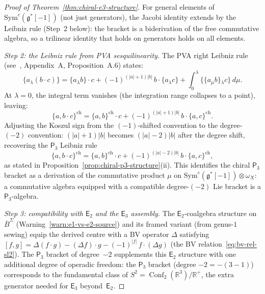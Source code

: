 \documentclass[11pt,reqno]{amsart}
\theoremstyle{definition}
\theoremstyle{remark}
\newcommand{\Etwo}{\mathsf{E}_{2}}
\newcommand{\Ethree}{\mathsf{E}_{3}}
\newcommand{\Pthree}{\mathsf{P}_{3}}
\newcommand{\Sym}{\mathrm{Sym}}
\DeclareMathOperator{\Conf}{Conf}
\newcommand{\fg}{\mathfrak{g}}
\newcommand{\BarSig}{\overline{B}^{\Sigma}}
\newcommand{\RR}{\mathbb{R}}
\numberwithin{equation}{section}
\begin{document}
\begin{proof}[Proof of Theorem~\ref{thm:chiral-e3-structure}]
For general elements of $\Sym^c(\fg^*[-1])$ (not just
generators), the Jacobi identity extends by the Leibniz
rule (Step~2 below): the bracket is a biderivation of the
free commutative algebra, so a trilinear identity that
holds on generators holds on all elements.

\textit{Step 2: the Leibniz rule from PVA sesquilinearity.}
The PVA right Leibniz rule
(see~\cite{Lorgat26II}, Appendix~A, Proposition~A.6)
states:
\[
  \{a \mathbin{{}_\lambda} (b \cdot c)\}
  = \{a \mathbin{{}_\lambda} b\} \cdot c
  + (-1)^{(|a|+1)|b|}\,
  b \cdot \{a \mathbin{{}_\lambda} c\}
  + \int_0^\lambda
  \{\{a \mathbin{{}_\mu} b\}
  \mathbin{{}_\lambda} c\}\,d\mu.
\]
At $\lambda = 0$, the integral term vanishes
(the integration range collapses to a point), leaving:
\[
  \{a, b \cdot c\}^{\mathrm{ch}}
  = \{a, b\}^{\mathrm{ch}} \cdot c
  + (-1)^{(|a|+1)|b|}\,
  b \cdot \{a, c\}^{\mathrm{ch}}.
\]
Adjusting the Koszul sign from the $(-1)$-shifted
convention to the degree-$(-2)$ convention:
$(|a|+1)|b|$ becomes $(|a|-2)|b|$ after the degree shift,
recovering the $\Pthree$ Leibniz rule
\[
  \{a, b \cdot c\}^{\mathrm{ch}}
  = \{a, b\}^{\mathrm{ch}} \cdot c
  + (-1)^{(|a|-2)|b|}\,
  b \cdot \{a, c\}^{\mathrm{ch}},
\]
as stated in
Proposition~\ref{prop:chiral-p3-structure}(ii). This
identifies the chiral $\Pthree$ bracket as a derivation of
the commutative product
$\mu$ on $\Sym^c(\fg^*[-1]) \otimes \omega_X$: a
commutative algebra equipped with a compatible
degree-$(-2)$ Lie bracket is a $\Pthree$-algebra.

\textit{Step 3: compatibility with $\Etwo$ and the
$\Ethree$ assembly.}
The $\Etwo$-coalgebra structure on $\BarSig$
(Warning~\ref{warn:e1-vs-e2-source}) and its framed
variant (from genus-$1$ sewing) equip the derived centre
with a BV operator $\Delta$ satisfying
$[f, g] = \Delta(f \cdot g) - (\Delta f) \cdot g
- (-1)^{|f|}\,f \cdot (\Delta g)$
(the BV relation~\eqref{eq:bv-rel-sl2}).
The $\Pthree$ bracket of degree~$-2$ supplements
this $\Etwo$ structure with one additional degree of
operadic freedom:
the $\Pthree$ bracket
(degree $-2 = -(3-1)$) corresponds to the fundamental
class of $S^2 = \Conf_2(\RR^3)/\RR^+$, the extra
generator needed for $\Ethree$ beyond~$\Etwo$.


\end{proof}
\end{document}
